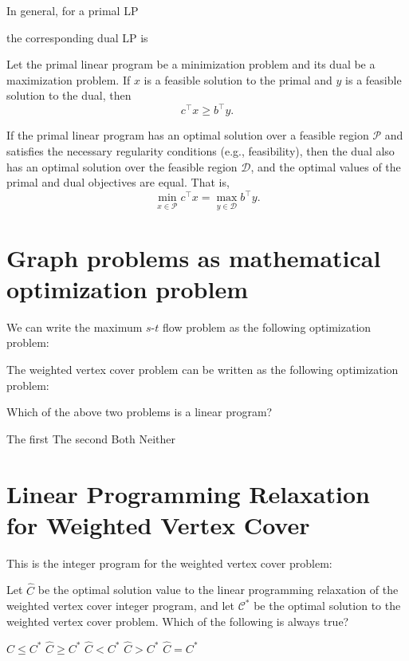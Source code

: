 \documentclass[11  pt]{article}
\begin{document}
\vs{1cm}
In general, for a primal LP

\vs{6cm}
the corresponding dual LP is

\vs{6cm}
\begin{theorem}
Let the primal linear program be a minimization problem and its dual be a maximization problem. If \( x \) is a feasible solution to the primal and \( y \) is a feasible solution to the dual, then
\[
c^\top x \geq b^\top y.
\]
\end{theorem}

\begin{theorem}
If the primal linear program has an optimal solution over a feasible region $\mathcal{P}$ and satisfies the necessary regularity conditions (e.g., feasibility), then the dual also has an optimal solution over the feasible region $\mathcal{D}$, and the optimal values of the primal and dual objectives are equal. That is,
\[
\min_{x \in \mathcal{P}} c^\top x = \max_{y \in \mathcal{D}} b^\top y.
\]
\end{theorem}


\newpage
\section{Graph problems as mathematical optimization problem}
We can write the maximum $s$-$t$ flow problem as the following optimization problem:


\vfill

The weighted vertex cover problem can be written as the following optimization problem:
\vfill

\begin{Qu}
	Which of the above two problems is a linear program?
	\begin{itemize}
		\aitem The first
		\bitem The second
		\citem Both
		\ditem Neither
	\end{itemize}
\end{Qu}


\section{Linear Programming Relaxation for Weighted Vertex Cover}
This is the integer program for the weighted vertex cover problem:



\vfill

\begin{Qu}
	Let $\hat{C}$ be the optimal solution value to the linear programming relaxation of the weighted vertex cover integer program, and let $\mathcal{C}^*$ be the optimal solution to the weighted vertex cover problem. Which of the following is always true?
	\begin{itemize}
		\aitem $\hat{C} \leq C^*$
		\bitem $\hat{C} \geq C^*$
		\citem $\hat{C} < C^*$
		\ditem $\hat{C} > C^*$
		\eitem $\hat{C} = C^*$
	\end{itemize}
\end{Qu}
\end{document}
